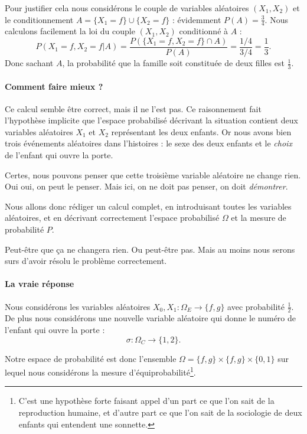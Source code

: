 Pour justifier cela nous considérons le couple de variables aléatoires \( \left( X_1,X_2 \right)\) et le conditionnement \( A=\{ X_1=f \}\cup\{ X_2=f \}\) : évidemment \( P(A)=\frac{ 3 }{ 4 }\). Nous calculons facilement la loi du couple \( (X_1,X_2)\) conditionné à \( A\) :
\begin{equation}
	P(X_1=f,X_2=f|A)=\frac{ P(  \{ X_1=f,X_2=f \}\cap A  ) }{ P(A) }=\frac{ 1/4 }{ 3/4 }=\frac{1}{ 3 }.
\end{equation}
Donc sachant \( A\), la probabilité que la famille soit constituée de deux filles est \( \frac{1}{ 3 }\).

\paragraph{Comment faire mieux ?}

Ce calcul semble être correct, mais il ne l'est pas. Ce raisonnement fait l'hypothèse implicite que l'espace probabilisé décrivant la situation contient deux variables aléatoires \( X_1\) et \( X_2\) représentant les deux enfants. Or nous avons bien trois événements aléatoires dans l'histoires : le sexe des deux enfants et le \emph{choix} de l'enfant qui ouvre la porte.

Certes, nous pouvons penser que cette troisième variable aléatoire ne change rien. Oui oui, on peut le penser. Mais ici, on ne doit pas penser, on doit \emph{démontrer}.

Nous allons donc rédiger un calcul complet, en introduisant toutes les variables aléatoires, et en décrivant correctement l'espace probabilisé \( \Omega\) et la mesure de probabilité \( P\).

Peut-être que ça ne changera rien. Ou peut-être pas. Mais au moins nous serons surs d'avoir résolu le problème correctement.

\paragraph{La vraie réponse}

Nous considérons les variables aléatoires \( X_0,X_1\colon \Omega_E\to \{ f,g \}\) avec probabilité \( \frac{ 1 }{2}\). De plus nous considérons une nouvelle variable aléatoire qui donne le numéro de l'enfant qui ouvre la porte :
\begin{equation}
	\sigma\colon \Omega_C\to \{ 1,2 \}.
\end{equation}

Notre espace de probabilité est donc l'ensemble \( \Omega=\{ f,g \}\times \{ f,g \}\times \{0,1\}\) sur lequel nous considérons la mesure d'équiprobabilité\footnote{C'est une hypothèse forte faisant appel d'un part ce que l'on sait de la reproduction humaine, et d'autre part ce que l'on sait de la sociologie de deux enfants qui entendent une sonnette.}.

